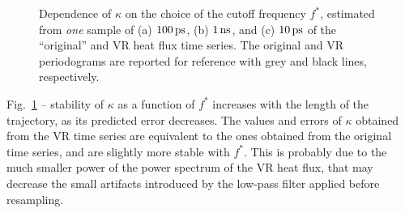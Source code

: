 \begin{figure}
    \centering
    \caption{Dependence of $\kappa$ on the choice of the cutoff frequency $f^*$, estimated from \emph{one} sample of (a) $100\,\mathrm{ps}$, (b) $1\,\mathrm{ns}$, and (c) $10\,\mathrm{ps}$ of the ``original'' and VR heat flux time series. 
    The original and VR periodograms are reported for reference with grey and black lines, respectively.}
    \label{fig:csilica-sample-expdens-fstar}
\end{figure}
Fig.~\ref{fig:csilica-sample-expdens-fstar} -- stability of $\kappa$ as a function of $f^*$ increases with the length of the trajectory, as its predicted error decreases. The values and errors of $\kappa$ obtained from the VR time series are equivalent to the ones obtained from the original time series, and are slightly more stable with $f^*$. This is probably due to the much smaller power of the power spectrum of the VR heat flux, that may decrease the small artifacts introduced by the low-pass filter applied before resampling. 
